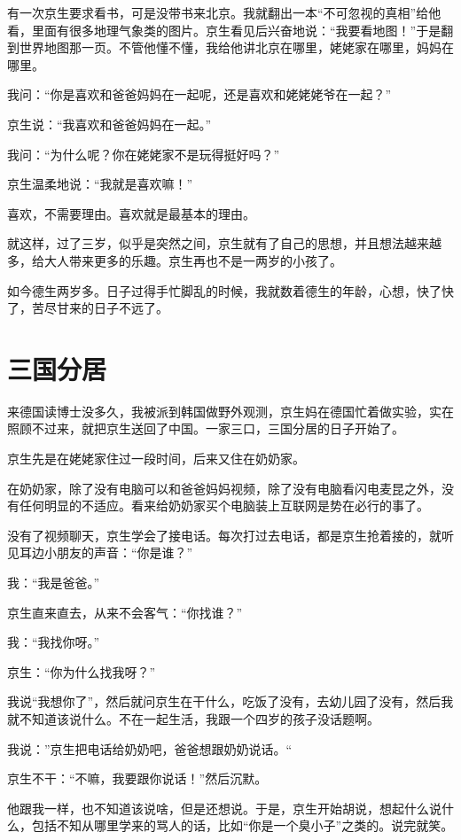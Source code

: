 \documentclass[twoside,openright,headings=optiontohead]{ctexbook} %
\begin{document}
{有一次京生要求看书，可是没带书来北京。我就翻出一本``不可忽视的真相''给他看，里面有很多地理气象类的图片。京生看见后兴奋地说：``我要看地图！''于是翻到世界地图那一页。不管他懂不懂，我给他讲北京在哪里，姥姥家在哪里，妈妈在哪里。

我问：``你是喜欢和爸爸妈妈在一起呢，还是喜欢和姥姥姥爷在一起？''

京生说：``我喜欢和爸爸妈妈在一起。''

我问：``为什么呢？你在姥姥家不是玩得挺好吗？''

京生温柔地说：``我就是喜欢嘛！''

喜欢，不需要理由。喜欢就是最基本的理由。

就这样，过了三岁，似乎是突然之间，京生就有了自己的思想，并且想法越来越多，给大人带来更多的乐趣。京生再也不是一两岁的小孩了。

如今德生两岁多。日子过得手忙脚乱的时候，我就数着德生的年龄，心想，快了快了，苦尽甘来的日子不远了。

\chapter*{三国分居}\label{three-kingdoms}

来德国读博士没多久，我被派到韩国做野外观测，京生妈在德国忙着做实验，实在照顾不过来，就把京生送回了中国。一家三口，三国分居的日子开始了。

京生先是在姥姥家住过一段时间，后来又住在奶奶家。

在奶奶家，除了没有电脑可以和爸爸妈妈视频，除了没有电脑看闪电麦昆之外，没有任何明显的不适应。看来给奶奶家买个电脑装上互联网是势在必行的事了。

没有了视频聊天，京生学会了接电话。每次打过去电话，都是京生抢着接的，就听见耳边小朋友的声音：``你是谁？''

我：``我是爸爸。''

京生直来直去，从来不会客气：``你找谁？''

我：``我找你呀。''

京生：``你为什么找我呀？''

我说``我想你了''，然后就问京生在干什么，吃饭了没有，去幼儿园了没有，然后我就不知道该说什么。不在一起生活，我跟一个四岁的孩子没话题啊。

我说：''京生把电话给奶奶吧，爸爸想跟奶奶说话。``

京生不干：``不嘛，我要跟你说话！''然后沉默。

他跟我一样，也不知道该说啥，但是还想说。于是，京生开始胡说，想起什么说什么，包括不知从哪里学来的骂人的话，比如``你是一个臭小子''之类的。说完就笑。

}
\end{document}
